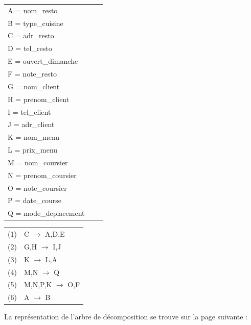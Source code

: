 \documentclass[french]{article}
\begin{document}
 
            \begin{tabular}{lll}
                A = nom\_resto \\
                B = type\_cuisine \\
                C = adr\_resto \\
                D = tel\_resto \\
                E = ouvert\_dimanche \\
                F = note\_resto \\
                G = nom\_client \\
                H = prenom\_client \\
                I = tel\_client \\
                J = adr\_client \\
                K = nom\_menu \\
                L = prix\_menu \\
                M = nom\_coursier \\
                N = prenom\_coursier \\
                O = note\_coursier \\
                P = date\_course \\
                Q = mode\_deplacement \\
            \end{tabular}
            \hfill
            \begin{tabular}{ll}
                (1) & C $\rightarrow$ A,D,E \\
                (2) & G,H $\rightarrow$ I,J \\
                (3) & K $\rightarrow$ L,A \\
                (4) & M,N $\rightarrow$ Q \\
                (5) & M,N,P,K $\rightarrow$ O,F \\
                (6) & A $\rightarrow$ B \\
            \end{tabular}
            \bigskip
            
            La représentation de l'arbre de décomposition se trouve sur la page suivante :\newpage
                
\end{document}
